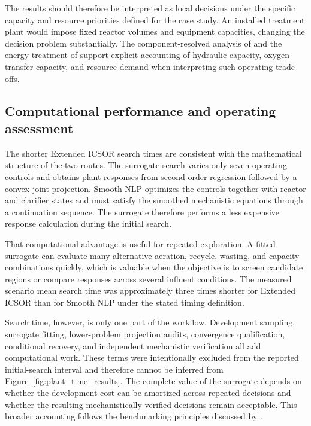 The results should therefore be interpreted as local decisions under the specific capacity and resource priorities defined for the case study. An installed treatment plant would impose fixed reactor volumes and equipment capacities, changing the decision problem substantially. The component-resolved analysis of \citet{Zhang2026} and the energy treatment of \citet{Miederer2025} support explicit accounting of hydraulic capacity, oxygen-transfer capacity, and resource demand when interpreting such operating trade-offs.

\subsection{Computational performance and operating assessment}

The shorter Extended ICSOR search times are consistent with the mathematical structure of the two routes. The surrogate search varies only seven operating controls and obtains plant responses from second-order regression followed by a convex joint projection. Smooth NLP optimizes the controls together with reactor and clarifier states and must satisfy the smoothed mechanistic equations through a continuation sequence. The surrogate therefore performs a less expensive response calculation during the initial search.

That computational advantage is useful for repeated exploration. A fitted surrogate can evaluate many alternative aeration, recycle, wasting, and capacity combinations quickly, which is valuable when the objective is to screen candidate regions or compare responses across several influent conditions. The measured scenario mean search time was approximately three times shorter for Extended ICSOR than for Smooth NLP under the stated timing definition.

Search time, however, is only one part of the workflow. Development sampling, surrogate fitting, lower-problem projection audits, convergence qualification, conditional recovery, and independent mechanistic verification all add computational work. These terms were intentionally excluded from the reported initial-search interval and therefore cannot be inferred from Figure~\ref{fig:plant_time_results}. The complete value of the surrogate depends on whether the development cost can be amortized across repeated decisions and whether the resulting mechanistically verified decisions remain acceptable. This broader accounting follows the benchmarking principles discussed by \citet{Bliek2023}.


